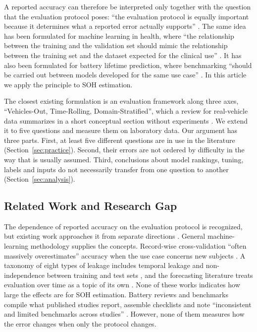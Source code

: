 \documentclass{ieeeaccess}
\begin{document}
A reported accuracy can therefore be interpreted only together with the question that the evaluation protocol poses: ``the evaluation protocol is equally important because it determines what a reported error actually supports'' \cite{sohail2026}. The same idea has been formulated for machine learning in health, where ``the relationship between the training and the validation set should mimic the relationship between the training set and the dataset expected for the clinical use'' \cite{saeb2017}. It has also been formulated for battery lifetime prediction, where benchmarking ``should be carried out between models developed for the same use case'' \cite{geslin2023}. In this article we apply the principle to SOH estimation.

The closest existing formulation is an evaluation framework along three axes, ``Vehicles-Out, Time-Rolling, Domain-Stratified'', which a review for real-vehicle data summarizes in a short conceptual section without experiments \cite{ma2026}. We extend it to five questions and measure them on laboratory data. Our argument has three parts. First, at least five different questions are in use in the literature (Section~\ref{sec:practice}). Second, their errors are not ordered by difficulty in the way that is usually assumed. Third, conclusions about model rankings, tuning, labels and inputs do not necessarily transfer from one question to another (Section~\ref{sec:analysis}).

\subsection{Related Work and Research Gap}
The dependence of reported accuracy on the evaluation protocol is recognized, but existing work approaches it from separate directions \cite{saeb2017,sohail2026,le2026,barua2026}. General machine-learning methodology supplies the concepts. Record-wise cross-validation ``often massively overestimates'' accuracy when the use case concerns new subjects \cite{saeb2017}. A taxonomy of eight types of leakage includes temporal leakage and non-independence between training and test sets \cite{kapoor2023}, and the forecasting literature treats evaluation over time as a topic of its own \cite{hewamalage2022,bergmeir2012}. None of these works indicates how large the effects are for SOH estimation. Battery reviews and benchmarks compile what published studies report, assemble checklists \cite{sohail2026,rizanov2026} and note ``inconsistent and limited benchmarks across studies'' \cite{tan2025}. However, none of them measures how the error changes when only the protocol changes.
\end{document}

